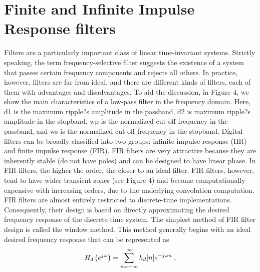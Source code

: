 
\section{Finite and Infinite Impulse Response filters}

Filters are a particularly important class of linear time-invariant systems. Strictly speaking, the term frequency-selective filter suggests the existence of a system that passes certain frequency components and rejects all others. In practice, however, filters are far from ideal, and there are different kinds of filters, each of them with advantages and disadvantages. To aid the discussion, in Figure 4, we show the main characteristics of a low-pass filter in the frequency domain. Here, d1 is the maximum ripple?s amplitude in the passband, d2 is maximum ripple?s amplitude in the stopband, wp is the normalized cut-off frequency in the passband, and ws is the normalized cut-off frequency in the stopband. Digital filters can be broadly classified into two groups: infinite impulse response (IIR) and finite impulse response (FIR). FIR filters are very attractive because they are inherently stable (do not have poles) and can be designed to have linear phase. In FIR filters, the higher the order, the closer to an ideal filter. FIR filters, however, tend to have wider transient zones (see Figure 4) and become computationally expensive with increasing orders, due to the underlying convolution computation. FIR filters are almost entirely restricted to discrete-time implementations. Consequently, their design is based on directly approximating the desired frequency response of the discrete-time system. The simplest method of FIR filter design is called the window method. This method generally begins with an ideal desired frequency response that can be represented as
% 
\begin{equation}
    \label{eq:filter}
    H_d \left( e^{j \omega} \right) = \sum_{n=-\infty}^{\infty} h_d[n] e^{-j \omega n}
    \hspace{0.25em},
\end{equation}
% 
